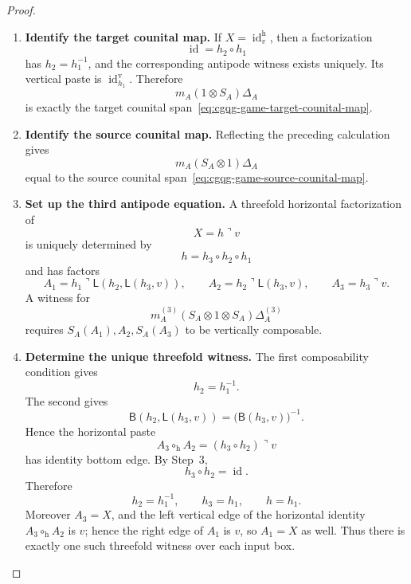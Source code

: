 \documentclass[oneside]{article}
\newcommand{\id}{\operatorname{id}}
\newcommand{\trcorner}{\mathbin{\urcorner}}
\newcommand{\leftedge}[2]{\mathsf{L}(#1,#2)}
\newcommand{\bottomedge}[2]{\mathsf{B}(#1,#2)}
\theoremstyle{plain}
\theoremstyle{definition}
\theoremstyle{remark}
\begin{document}
\begin{proof}
\begin{enumerate}[beginpenalty=10000]
        \item \textbf{Identify the target counital map.} If \(X=\id_v^{\mathrm h}\), then a factorization
        \[
            \id=h_2\circ h_1
        \]
        has \(h_2=h_1^{-1}\), and the corresponding antipode witness exists uniquely. Its vertical paste is \(\id_{h_1}^{\mathrm v}\). Therefore
        \[
            m_A(1\otimes S_A)\Delta_A
        \]
        is exactly the target counital span~\eqref{eq:cgqg-game-target-counital-map}.

        \item \textbf{Identify the source counital map.} Reflecting the preceding calculation gives
        \[
            m_A(S_A\otimes1)\Delta_A
        \]
        equal to the source counital span~\eqref{eq:cgqg-game-source-counital-map}.

        \item \textbf{Set up the third antipode equation.} A threefold horizontal factorization of
        \[
            X=h\trcorner v
        \]
        is uniquely determined by
        \[
            h=h_3\circ h_2\circ h_1
        \]
        and has factors
        \[
            A_1
            =
            h_1
            \trcorner
            \leftedge{h_2}{\leftedge{h_3}{v}},
            \qquad
            A_2
            =
            h_2\trcorner\leftedge{h_3}{v},
            \qquad
            A_3
            =
            h_3\trcorner v.
        \]
        A witness for
        \[
            m_A^{(3)}
            (S_A\otimes1\otimes S_A)
            \Delta_A^{(3)}
        \]
        requires \(S_A(A_1),A_2,S_A(A_3)\) to be vertically composable.

        \item \textbf{Determine the unique threefold witness.} The first composability condition gives
        \[
            h_2=h_1^{-1}.
        \]
        The second gives
        \[
            \bottomedge{h_2}{\leftedge{h_3}{v}}
            =
            \bigl(\bottomedge{h_3}{v}\bigr)^{-1}.
        \]
        Hence the horizontal paste
        \[
            A_3\circ_{\mathrm h}A_2
            =
            (h_3\circ h_2)\trcorner v
        \]
        has identity bottom edge. By Step~3,
        \[
            h_3\circ h_2=\id.
        \]
        Therefore
        \[
            h_2=h_1^{-1},
            \qquad
            h_3=h_1,
            \qquad
            h=h_1.
        \]
        Moreover \(A_3=X\), and the left vertical edge of the horizontal identity \(A_3\circ_{\mathrm h}A_2\) is \(v\); hence the right edge of \(A_1\) is \(v\), so \(A_1=X\) as well. Thus there is exactly one such threefold witness over each input box.


\end{enumerate}
\end{proof}
\end{document}
